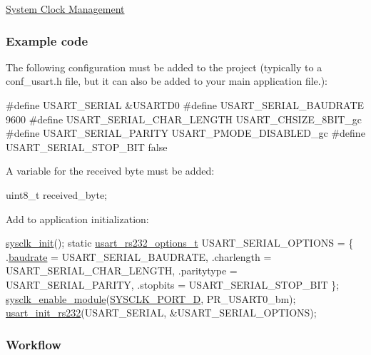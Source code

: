 \begin{DoxyEnumerate}
\item \hyperlink{group__sysclk__group}{System Clock Management}
\end{DoxyEnumerate}\hypertarget{usart_use_case_1_usart_use_case_1_setup_code}{}\subsubsection{Example code}\label{usart_use_case_1_usart_use_case_1_setup_code}

\begin{DoxyEnumerate}
\item The following configuration must be added to the project (typically to a conf\-\_\-usart.\-h file, but it can also be added to your main application file.)\-: 
\begin{DoxyCode}
\textcolor{preprocessor}{        #define USART\_SERIAL                     &USARTD0}
\textcolor{preprocessor}{}\textcolor{preprocessor}{        #define USART\_SERIAL\_BAUDRATE            9600}
\textcolor{preprocessor}{}\textcolor{preprocessor}{        #define USART\_SERIAL\_CHAR\_LENGTH         USART\_CHSIZE\_8BIT\_gc}
\textcolor{preprocessor}{}\textcolor{preprocessor}{        #define USART\_SERIAL\_PARITY              USART\_PMODE\_DISABLED\_gc}
\textcolor{preprocessor}{        #define USART\_SERIAL\_STOP\_BIT            false}
\end{DoxyCode}

\end{DoxyEnumerate}

A variable for the received byte must be added\-: 
\begin{DoxyCode}
 uint8\_t received\_byte; 
\end{DoxyCode}


Add to application initialization\-: 
\begin{DoxyCode}
         \hyperlink{group__sysclk__group_ga242399e48a97739c88b4d0c00f6101de}{sysclk\_init}();
         \textcolor{keyword}{static} \hyperlink{structusart__rs232__options}{usart\_rs232\_options\_t} USART\_SERIAL\_OPTIONS
       = \{
            .\hyperlink{structusart__rs232__options_a2c48c35d680d4805d357677d7d352fd0}{baudrate} = USART\_SERIAL\_BAUDRATE,
            .charlength = USART\_SERIAL\_CHAR\_LENGTH,
            .paritytype = USART\_SERIAL\_PARITY,
            .stopbits = USART\_SERIAL\_STOP\_BIT
         \};
        \hyperlink{group__sysclk__group_gac31edbbb1296f1eb737401b7b2b4e352}{sysclk\_enable\_module}(\hyperlink{group__sysclk__group_gga8e29b46d7670875f4c509efd7a8d5f1aa953a41943eb2d157ee9edcfcd431ce46}{SYSCLK\_PORT\_D}, 
      PR\_USART0\_bm);
        \hyperlink{group__usart__group_ga507caac3c2c003461cd6ded584af984d}{usart\_init\_rs232}(USART\_SERIAL, &USART\_SERIAL\_OPTIONS);
\end{DoxyCode}
\hypertarget{usart_use_case_1_usart_use_case_1_setup_flow}{}\subsubsection{Workflow}\label{usart_use_case_1_usart_use_case_1_setup_flow}


